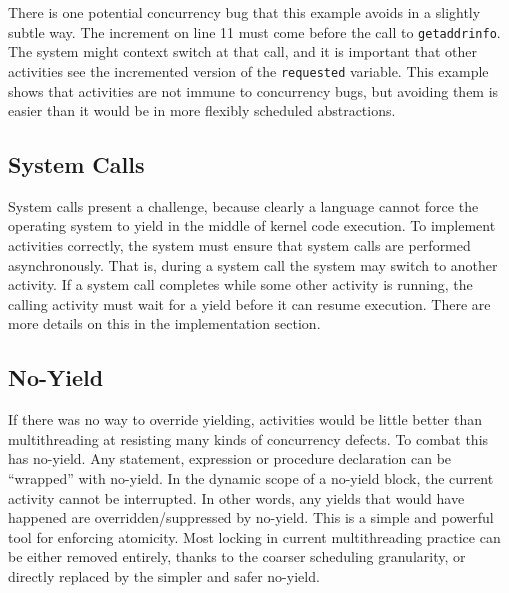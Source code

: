 \documentclass[9pt,preprint]{sigplanconf}
\begin{document}
There is one potential concurrency bug that this example avoids in a slightly subtle way.
The increment on line 11 must come before the call to \texttt{getaddrinfo}.
The system might context switch at that call, and it is important that other activities see the incremented version of the \texttt{requested} variable.
This example shows that activities are not immune to concurrency bugs, but avoiding them is easier than it would be in more flexibly scheduled abstractions.








\subsection{System Calls}

System calls present a challenge, because clearly a language cannot force the operating system to yield in the middle of kernel code execution.
To implement activities correctly, the system must ensure that system calls are performed asynchronously.
That is, during a system call the system may switch to another activity.
If a system call completes while some other activity is running, the calling activity must wait for a yield before it can resume execution.
There are more details on this in the implementation section.

\subsection{No-Yield}
\label{sec:noyield}

If there was no way to override yielding, activities would be little better than multithreading at resisting many kinds of concurrency defects.
To combat this \charcoal{} has no-yield.
Any statement, expression or procedure declaration can be ``wrapped'' with no-yield.
In the dynamic scope of a no-yield block, the current activity cannot be interrupted.
In other words, any yields that would have happened are overridden/suppressed by no-yield.
This is a simple and powerful tool for enforcing atomicity.
Most locking in current multithreading practice can be either removed entirely, thanks to the coarser scheduling granularity, or directly replaced by the simpler and safer no-yield.
\end{document}
